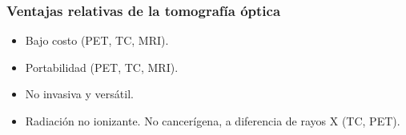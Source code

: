 \begin{frame}
\frametitle{Ventajas relativas de la tomografía óptica}


 \begin{itemize}%
	\item Bajo costo (PET, TC, MRI).
	\item Portabilidad (PET, TC, MRI).
	\item No invasiva y versátil.
	\item Radiación no ionizante. No cancerígena, a diferencia de rayos X (TC, PET).
 \end{itemize}

\end{frame}

